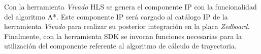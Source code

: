 Con la herramienta \emph{Vivado} \ac{HLS} se genera el componente \ac{IP} con la funcionalidad del algoritmo A*. Este componente \ac{IP} será cargado al catálogo \ac{IP} de la herramienta \emph{Vivado} para realizar su posterior integración en la placa \emph{Zedboard}. Finalmente, con la herramienta \ac{SDK} se invocan funciones necesarias para la utilización del componente referente al algoritmo de cálculo de trayectoria.



